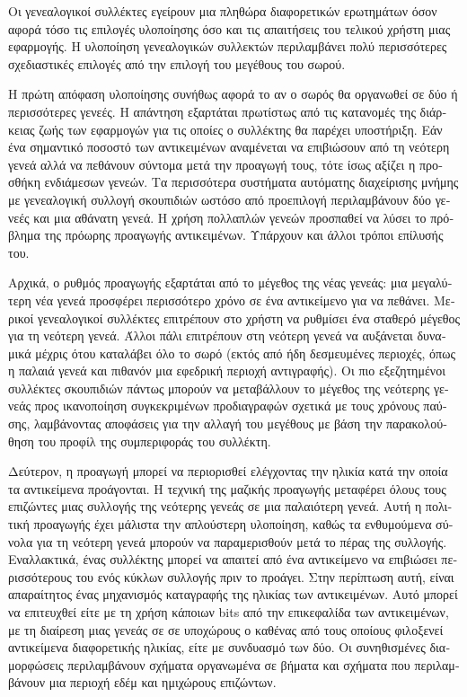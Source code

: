 \begin{greek}
Οι γενεαλογικοί συλλέκτες εγείρουν μια πληθώρα διαφορετικών
ερωτημάτων όσον αφορά τόσο τις επιλογές υλοποίησης όσο και
τις απαιτήσεις του τελικού χρήστη μιας εφαρμογής. Η υλοποίηση
γενεαλογικών συλλεκτών περιλαμβάνει πολύ περισσότερες σχεδιαστικές
επιλογές από την επιλογή του μεγέθους του σωρού.

Η πρώτη απόφαση υλοποίησης συνήθως αφορά το αν ο σωρός θα
οργανωθεί σε δύο ή περισσότερες γενεές. Η απάντηση εξαρτάται
πρωτίστως από τις κατανομές της διάρκειας ζωής των εφαρμογών
για τις οποίες ο συλλέκτης θα παρέχει υποστήριξη. Εάν ένα
σημαντικό ποσοστό των αντικειμένων αναμένεται να επιβιώσουν
από τη νεότερη γενεά αλλά να πεθάνουν σύντομα μετά την προαγωγή
τους, τότε ίσως αξίζει η προσθήκη ενδιάμεσων γενεών. Τα περισσότερα
συστήματα αυτόματης διαχείρισης μνήμης με γενεαλογική συλλογή
σκουπιδιών ωστόσο από προεπιλογή περιλαμβάνουν δύο γενεές και
μια αθάνατη γενεά. Η χρήση πολλαπλών γενεών προσπαθεί να λύσει
το πρόβλημα της πρόωρης προαγωγής αντικειμένων. Υπάρχουν και
άλλοι τρόποι επίλυσής του.

Αρχικά, ο ρυθμός προαγωγής εξαρτάται από το μέγεθος της νέας
γενεάς: μια μεγαλύτερη νέα γενεά προσφέρει περισσότερο χρόνο
σε ένα αντικείμενο για να πεθάνει. Μερικοί γενεαλογικοί συλλέκτες
επιτρέπουν στο χρήστη να ρυθμίσει ένα σταθερό μέγεθος για τη
νεότερη γενεά. Άλλοι πάλι επιτρέπουν στη νεότερη γενεά να
αυξάνεται δυναμικά μέχρις ότου καταλάβει όλο το σωρό (εκτός
από ήδη δεσμευμένες περιοχές, όπως η παλαιά γενεά και πιθανόν
μια εφεδρική περιοχή αντιγραφής). Οι πιο εξεζητημένοι συλλέκτες
σκουπιδιών πάντως μπορούν να μεταβάλλουν το μέγεθος της νεότερης
γενεάς προς ικανοποίηση συγκεκριμένων προδιαγραφών σχετικά
με τους χρόνους παύσης, λαμβάνοντας αποφάσεις για την αλλαγή
του μεγέθους με βάση την παρακολούθηση του προφίλ της συμπεριφοράς
του συλλέκτη.

Δεύτερον, η προαγωγή μπορεί να περιορισθεί ελέγχοντας την ηλικία
κατά την οποία τα αντικείμενα προάγονται. Η τεχνική της μαζικής
προαγωγής μεταφέρει όλους τους επιζώντες μιας συλλογής της νεότερης
γενεάς σε μια παλαιότερη γενεά. Αυτή η πολιτική προαγωγής έχει
μάλιστα την απλούστερη υλοποίηση, καθώς τα ενθυμούμενα σύνολα
για τη νεότερη γενεά μπορούν να παραμερισθούν μετά το πέρας
της συλλογής. Εναλλακτικά, ένας συλλέκτης μπορεί να απαιτεί
από ένα αντικείμενο να επιβιώσει περισσότερους του ενός κύκλων
συλλογής πριν το προάγει. Στην περίπτωση αυτή, είναι απαραίτητος
ένας μηχανισμός καταγραφής της ηλικίας των αντικειμένων. Αυτό
μπορεί να επιτευχθεί είτε με τη χρήση κάποιων bits από την
επικεφαλίδα των αντικειμένων, με τη διαίρεση μιας γενεάς σε
σε υποχώρους ο καθένας από τους οποίους φιλοξενεί αντικείμενα
διαφορετικής ηλικίας, είτε με συνδυασμό των δύο. Οι συνηθισμένες
διαμορφώσεις περιλαμβάνουν σχήματα οργανωμένα σε βήματα και
σχήματα που περιλαμβάνουν μια περιοχή εδέμ και ημιχώρους επιζώντων.


\end{greek}
